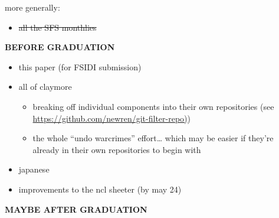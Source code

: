 more generally:

\begin{itemize}
\tightlist
\item
  \st{all the SFS monthlies}
\end{itemize}

\textbf{BEFORE GRADUATION}

\begin{itemize}
\tightlist
\item
  this paper (for FSIDI submission)
\item
  all of claymore

  \begin{itemize}
  \tightlist
  \item
    breaking off individual components into their own repositories (see
    \href{https://github.com/newren/git-filter-repo}{https://github.com/newren/git-filter-repo)})
  \item
    the whole ``undo warcrimes'' effort\ldots{} which may be easier if
    they're already in their own repositories to begin with
  \end{itemize}
\item
  japanese
\item
  improvements to the ncl sheeter (by may 24)
\end{itemize}

\textbf{MAYBE AFTER GRADUATION}

